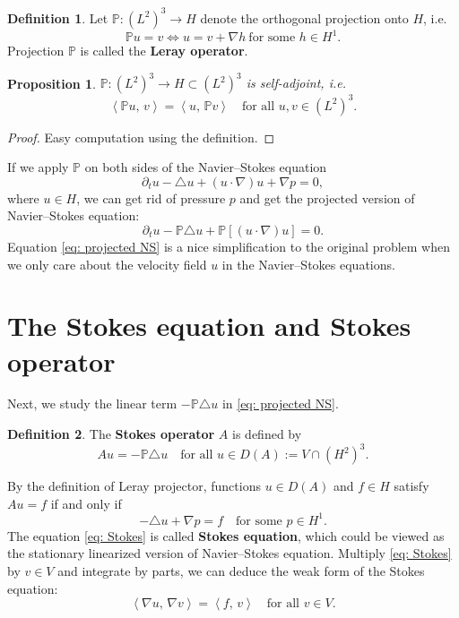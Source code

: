 \documentclass[a4paper, 12pt, oneside]{amsart}
\newtheorem{proposition}[theorem]{Proposition}
\theoremstyle{definition}
\newtheorem*{definition}{Definition}
\theoremstyle{remark}
\newcommand{\bk}[2]{\left\langle #1,\, #2 \right\rangle}
\newcommand{\p}{\partial}
\newcommand{\mb}[1]{\mathbb{#1}}
\newcommand{\laplace}{\triangle}
\begin{document}
\begin{definition}
    Let $\mb{P}: (L^2)^3\to H$ denote the orthogonal projection onto $H$, i.e.
    \[
        \mb{P}u = v\iff u = v + \nabla h\ \text{for some $h\in H^1$}.
    \]
    Projection $\mb{P}$ is called the \textbf{Leray operator}.
\end{definition}

\begin{proposition}
    $\mb{P}: (L^2)^3\to H\subset (L^2)^3$ is self-adjoint, i.e.
    \[
        \bk{\mb{P}u}{v} = \bk{u}{\mb{P}v}\quad\text{for all $u, v\in (L^2)^3$}.
    \]
\end{proposition}

\begin{proof}
    Easy computation using the definition.
\end{proof}

If we apply $\mb{P}$ on both sides of the Navier--Stokes equation
\[
    \p_t u - \laplace u + (u\cdot\nabla)u + \nabla p = 0,
\]
where $u\in H$, we can get rid of pressure $p$ and get the projected version of Navier--Stokes equation:
\begin{equation}
    \label{eq: projected NS}
    \p_t u - \mb{P}\laplace u + \mb{P}[(u\cdot\nabla) u] = 0.
\end{equation}
Equation \eqref{eq: projected NS} is a nice simplification to the original problem when we only care about the velocity field $u$ in the Navier--Stokes equations.

\section{The Stokes equation and Stokes operator}

Next, we study the linear term $-\mb{P}\laplace u$ in \eqref{eq: projected NS}.

\begin{definition}
    The \textbf{Stokes operator} $A$ is defined by
    \[
        Au = -\mb{P}\laplace u\quad\text{for all $u\in D(A) := V \cap (H^2)^3.$}
    \]
\end{definition}

By the definition of Leray projector, functions $u\in D(A)$ and $f\in H$ satisfy $Au=f$ if and only if
\begin{equation}
    \label{eq: Stokes}
    -\laplace u + \nabla p = f\quad \text{for some $p\in H^1$}.
\end{equation}
The equation \eqref{eq: Stokes} is called \textbf{Stokes equation}, which could be viewed as the stationary linearized version of Navier--Stokes equation. Multiply \eqref{eq: Stokes} by $v\in V$ and integrate by parts, we can deduce the weak form of the Stokes equation:
\begin{equation}
    \label{eq: weak Stokes}
    \bk{\nabla u}{\nabla v} = \bk{f}{v}\quad\text{for all $v\in V$}.
\end{equation}
\end{document}
